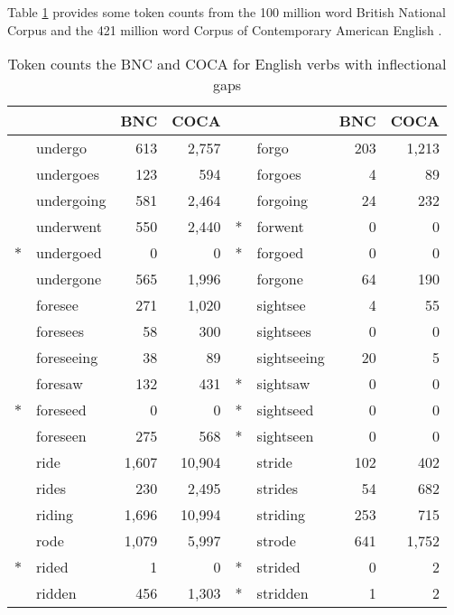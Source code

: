 Table \ref{fgo} provides some token counts from the 100 million word British National Corpus \citep{BNC,BYUBNC} and the 421 million word Corpus of Contemporary American English \citep{COCA}. 

\begin{table}
\centering
\begin{tabular}{l@{} l r r l@{} l r r} 
\toprule
    &            & BNC   & COCA   &   &             & BNC & COCA  \\ 
\midrule
    & undergo    & 613   & 2,757  &   & forgo       & 203 & 1,213 \\
    & undergoes  & 123   & 594    &   & forgoes     & 4   & 89    \\
    & undergoing & 581   & 2,464  &   & forgoing    & 24  & 232   \\
    & underwent  & 550   & 2,440  & * & forwent     & 0   & 0     \\
$*$ & undergoed  & 0     & 0      & * & forgoed     & 0   & 0     \\
    & undergone  & 565   & 1,996  &   & forgone     & 64  & 190   \\ 
\midrule
    & foresee    & 271   & 1,020  &   & sightsee    & 4   & 55    \\
    & foresees   & 58    & 300    &   & sightsees   & 0   & 0     \\
    & foreseeing & 38    & 89     &   & sightseeing & 20  & 5     \\
    & foresaw    & 132   & 431    & * & sightsaw    & 0   & 0     \\
$*$ & foreseed   & 0     & 0      & * & sightseed   & 0   & 0     \\
    & foreseen   & 275   & 568    & * & sightseen   & 0   & 0     \\ 
\midrule
    & ride       & 1,607 & 10,904 &   & stride      & 102 & 402   \\
    & rides      & 230   & 2,495  &   & strides     & 54  & 682   \\
    & riding     & 1,696 & 10,994 &   & striding    & 253 & 715   \\
    & rode       & 1,079 & 5,997  &   & strode      & 641 & 1,752 \\
$*$ & rided      & 1     & 0      & * & strided     & 0   & 2     \\
    & ridden     & 456   & 1,303  & * & stridden    & 1   & 2     \\ 
\bottomrule
\end{tabular}
\caption{Token counts the BNC and COCA for English verbs with inflectional gaps}
\label{fgo}
\end{table}

